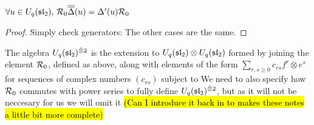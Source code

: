 \documentclass{article}
\begin{document}
\begin{lemma}
$\forall u \in U_q(\mathfrak{sl}_2), \, \mathcal{R}_0 \overline{\overline{\Delta}}(u) = \Delta^\prime(u) \mathcal{R}_0$
\end{lemma}
\begin{proof}
Simply check generators:
The other cases are the same. 
\end{proof}

\begin{definition}
The algebra $U_q(\mathfrak{sl}_2)^{\hat{\otimes}2}$ is the extension to  $U_q(\mathfrak{sl}_2) \otimes U_q(\mathfrak{sl}_2)$ formed by joining the element $\mathcal{R}_0$, defined as above, along with elements of the form $\sum_{r,s \geq 0} c_{rs} f^r \otimes e^s$ for sequences of complex numbers $(c_{rs})$ subject to 
We need to also specify how $\mathcal{R}_0$ commutes with power series to fully define $U_q(\mathfrak{sl}_2)^{\hat{\otimes}2}$, but as it will not be neccesary for us we will omit it \hl{(Can I introduce it back in to makes these notes a little bit more complete)}
\end{definition}
\end{document}

